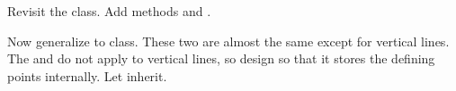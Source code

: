 \begin{exercise}
  \label{ex:geom:line3}
  Revisit the  class.
  Add methods  and .

  Now generalize  to 
  class. These two are almost the same except for vertical lines.
  The  and  do not apply to vertical lines, so
  design  so that it stores the defining points
  internally. Let  inherit.
\end{exercise}

